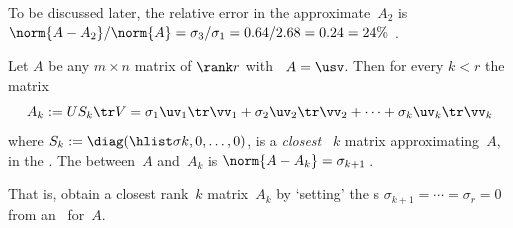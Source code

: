 \begin{reduce}
\begin{example}
\begin{solution}
To be discussed later, the relative error in the approximate~\(A_2\) is \(\norm{A-A_2}/\norm{A} =\sigma_3/\sigma_1 =0.64/2.68 =0.24 =24\%\) \twodp.
\end{solution}
\end{example}
\end{reduce}








\begin{theorem} \label{thm:am}
Let \(A\) be any \(m\times n\) matrix of \(\rank r\) with \svd\ \(A=\usv\).  
Then for every \(k< r\) the matrix
\begin{equation}
A_k:=US_k\tr V =\sigma_1\uv_1\tr\vv_1 +\sigma_2\uv_2\tr\vv_2+\cdots +\sigma_k\uv_k\tr\vv_k
\label{eq:rankkA}
\end{equation}
where \(S_k:=\diag(\hlist\sigma k,0,\ldots,0)\), is a \emph{closest} ~\(k\) matrix approximating~\(A\), in the .
The  between~\(A\) and~\(A_k\) is \(\norm{A-A_k}=\sigma_{k+1}\)\,.
\end{theorem}

That is, obtain a closest rank~\(k\) matrix~\(A_k\) by `setting' the s \(\sigma_{k+1}=\cdots=\sigma_r=0\) from an \svd\ for~\(A\).

